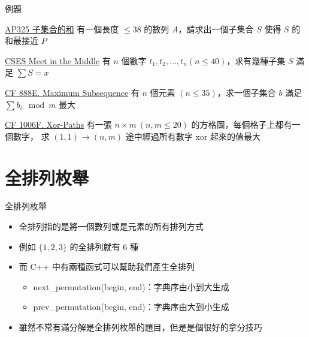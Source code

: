 \documentclass[aspectratio=169]{beamer}
\begin{document}
    \begin{frame}{例題}
        \begin{block}{\href{https://judge.tcirc.tw/ShowProblem?problemid=d019}{AP325 子集合的和}}
            有一個長度 $\le 38$ 的數列 $A$，請求出一個子集合 $S$ 使得 $S$ 的和最接近 $P$
        \end{block}

        \begin{block}{\href{https://cses.fi/problemset/task/1628/}{CSES Meet in the Middle}}
            有 $n$ 個數字 $t_1, t_2, \dots, t_n (n \le 40)$，求有幾種子集 $S$ 滿足 $\sum S = x$
        \end{block}

        \begin{block}{\href{https://codeforces.com/problemset/problem/888/E}{CF 888E. Maximum Subsequence}}
            有 $n$ 個元素 $(n \le 35)$，求一個子集合 $b$ 滿足 $\sum{b_i \mod m}$ 最大
        \end{block}

        \begin{block}{\href{https://codeforces.com/problemset/problem/1006/F}{CF 1006F. Xor-Paths}}
            有一張 $n \times m\ (n, m \le 20)$ 的方格圖，每個格子上都有一個數字，
            求 $(1, 1) \rightarrow (n, m)$ 途中經過所有數字 xor 起來的值最大
        \end{block}
    \end{frame}


    \section{全排列枚舉}

    \begin{frame}{全排列枚舉}
        \begin{itemize}
            \item<1-> 全排列指的是將一個數列或是元素的所有排列方式
            \item<1-> 例如 $\{1, 2, 3\}$ 的全排列就有 $6$ 種
            \item<2-> 而 C++ 中有兩種函式可以幫助我們產生全排列
            \begin{itemize}
                \item<2-> next\_permutation(begin, end)：字典序由小到大生成
                \item<2-> prev\_permutation(begin, end)：字典序由大到小生成
            \end{itemize}
            \item<3-> 雖然不常有滿分解是全排列枚舉的題目，但是是個很好的拿分技巧
        \end{itemize}
    \end{frame}
\end{document}
